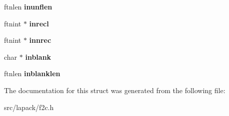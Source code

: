 \begin{DoxyCompactItemize}
\item 
\hypertarget{structinlist_a4a5e555086d129a2b8edc7d2ff3b3725}{ftnlen {\bfseries inunflen}}\label{structinlist_a4a5e555086d129a2b8edc7d2ff3b3725}

\item 
\hypertarget{structinlist_ad11fedcf60bcfb643548dc8992f8774c}{ftnint $\ast$ {\bfseries inrecl}}\label{structinlist_ad11fedcf60bcfb643548dc8992f8774c}

\item 
\hypertarget{structinlist_a0d5491f5ed82c5e4f787ac0411fd7600}{ftnint $\ast$ {\bfseries innrec}}\label{structinlist_a0d5491f5ed82c5e4f787ac0411fd7600}

\item 
\hypertarget{structinlist_a3cbc44275b6c1cab2d1aad14af0b3318}{char $\ast$ {\bfseries inblank}}\label{structinlist_a3cbc44275b6c1cab2d1aad14af0b3318}

\item 
\hypertarget{structinlist_a2aec2496017c66c3ba0d96adcb2b37a0}{ftnlen {\bfseries inblanklen}}\label{structinlist_a2aec2496017c66c3ba0d96adcb2b37a0}

\end{DoxyCompactItemize}


\-The documentation for this struct was generated from the following file\-:\begin{DoxyCompactItemize}
\item 
src/lapack/f2c.\-h\end{DoxyCompactItemize}
